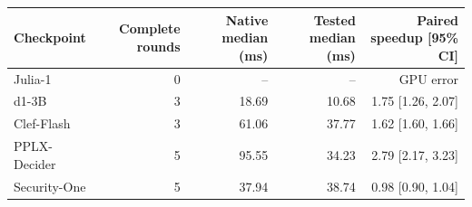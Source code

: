 \begin{tabular}{lrrrr}
\toprule
Checkpoint & Complete rounds & Native median (ms) & Tested median (ms) & Paired speedup [95\% CI] \\
\midrule
Julia-1 & 0 & -- & -- & GPU error \\
d1-3B & 3 & 18.69 & 10.68 & 1.75 [1.26, 2.07] \\
Clef-Flash & 3 & 61.06 & 37.77 & 1.62 [1.60, 1.66] \\
PPLX-Decider & 5 & 95.55 & 34.23 & 2.79 [2.17, 3.23] \\
Security-One & 5 & 37.94 & 38.74 & 0.98 [0.90, 1.04] \\
\bottomrule
\end{tabular}
